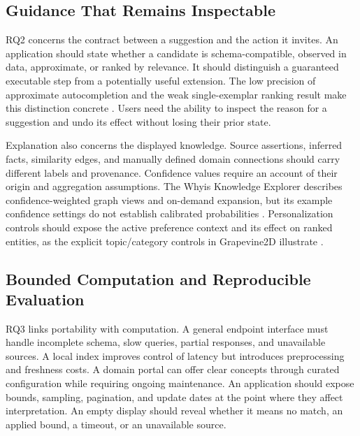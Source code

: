 \documentclass[manuscript,review,screen]{acmart}
\begin{document}
\subsection{Guidance That Remains Inspectable}
RQ2 concerns the contract between a suggestion and the action it invites. An application should state whether a candidate is schema-compatible, observed in data, approximate, or ranked by relevance. It should distinguish a guaranteed executable step from a potentially useful extension. The low precision of approximate autocompletion and the weak single-exemplar ranking result make this distinction concrete \citep{2021_Parra_Fast_Approximate,2020_Lissandrini_Graph-Query_Suggestions}. Users need the ability to inspect the reason for a suggestion and undo its effect without losing their prior state.

Explanation also concerns the displayed knowledge. Source assertions, inferred facts, similarity edges, and manually defined domain connections should carry different labels and provenance. Confidence values require an account of their origin and aggregation assumptions. The Whyis Knowledge Explorer describes confidence-weighted graph views and on-demand expansion, but its example confidence settings do not establish calibrated probabilities \citep{V3-00740}. Personalization controls should expose the active preference context and its effect on ranked entities, as the explicit topic/category controls in Grapevine2D illustrate \citep{V3-00694}.

\subsection{Bounded Computation and Reproducible Evaluation}
RQ3 links portability with computation. A general endpoint interface must handle incomplete schema, slow queries, partial responses, and unavailable sources. A local index improves control of latency but introduces preprocessing and freshness costs. A domain portal can offer clear concepts through curated configuration while requiring ongoing maintenance. An application should expose bounds, sampling, pagination, and update dates at the point where they affect interpretation. An empty display should reveal whether it means no match, an applied bound, a timeout, or an unavailable source.
\end{document}
